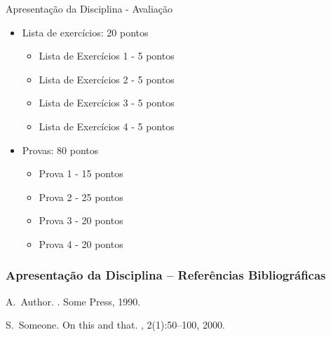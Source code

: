 \documentclass{beamer}
\begin{document}

\begin{frame}{Apresentação da Disciplina - Avaliação}
\begin{itemize}
\item Lista de exercícios: 20 pontos
\begin{itemize}
    \item Lista de Exercícios 1 - 5 pontos
    \item Lista de Exercícios 2 - 5 pontos
    \item Lista de Exercícios 3 - 5 pontos
    \item Lista de Exercícios 4 - 5 pontos
\end{itemize}
\item Provas: 80 pontos
\begin{itemize}
    \item Prova 1 - 15 pontos
    \item Prova 2 - 25 pontos
    \item Prova 3 - 20 pontos
    \item Prova 4 - 20 pontos
\end{itemize}
\end{itemize}
\end{frame}

\usebackgroundtemplate{ }


\begin{frame}[allowframebreaks]
  \frametitle<presentation>{Apresentação da Disciplina – Referências Bibliográficas}
    
  \begin{thebibliography}{10}
    
  \beamertemplatebookbibitems

    A.~Author.
    .
    \newblock Some Press, 1990.
 
    
  \beamertemplatearticlebibitems

    S.~Someone.
    \newblock On this and that.
    , 2(1):50--100,
    2000.
  \end{thebibliography}
\end{frame}
\end{document}
